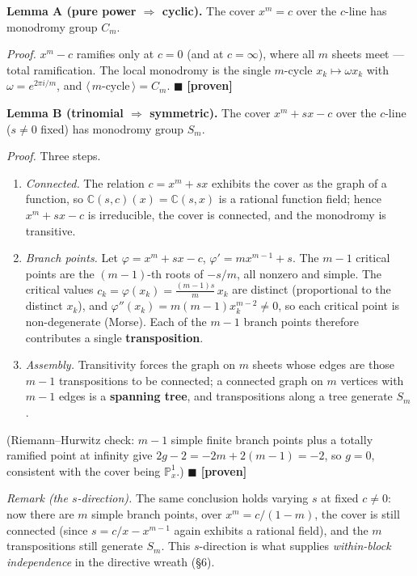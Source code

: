 \documentclass[11pt]{article}
\providecommand{\tightlist}{\setlength{\itemsep}{0pt}\setlength{\parskip}{0pt}}
\theoremstyle{plain}
\theoremstyle{definition}
\theoremstyle{remark}
\begin{document}
\textbf{Lemma A (pure power \(\Rightarrow\) cyclic).} The cover \(x^m = c\) over the \(c\)-line has monodromy group \(C_m\).

\emph{Proof.} \(x^m - c\) ramifies only at \(c = 0\) (and at \(c = \infty\)), where all \(m\) sheets meet --- total ramification. The local monodromy is the single \(m\)-cycle \(x_k \mapsto \omega x_k\) with \(\omega = e^{2\pi i/m}\), and \(\langle\,m\text{-cycle}\,\rangle = C_m\). \(\blacksquare\) \textbf{{[}proven{]}}

\textbf{Lemma B (trinomial \(\Rightarrow\) symmetric).} The cover \(x^m + sx - c\) over the \(c\)-line (\(s \neq 0\) fixed) has monodromy group \(S_m\).

\emph{Proof.} Three steps.

\begin{enumerate}
\def\labelenumi{\arabic{enumi}.}
\tightlist
\item
  \emph{Connected.} The relation \(c = x^m + sx\) exhibits the cover as the graph of a function, so \(\mathbb C(s,c)(x) = \mathbb C(s,x)\) is a rational function field; hence \(x^m+sx-c\) is irreducible, the cover is connected, and the monodromy is transitive.
\item
  \emph{Branch points.} Let \(\varphi = x^m + sx - c\), \(\varphi' = mx^{m-1}+s\). The \(m-1\) critical points are the \((m{-}1)\)-th roots of \(-s/m\), all nonzero and simple. The critical values \(c_k = \varphi(x_k) = \tfrac{(m-1)s}{m}\,x_k\) are distinct (proportional to the distinct \(x_k\)), and \(\varphi''(x_k) = m(m-1)x_k^{m-2}\neq 0\), so each critical point is non-degenerate (Morse). Each of the \(m-1\) branch points therefore contributes a single \textbf{transposition}.
\item
  \emph{Assembly.} Transitivity forces the graph on \(m\) sheets whose edges are those \(m-1\) transpositions to be connected; a connected graph on \(m\) vertices with \(m-1\) edges is a \textbf{spanning tree}, and transpositions along a tree generate \(S_m\).
\end{enumerate}

(Riemann--Hurwitz check: \(m-1\) simple finite branch points plus a totally ramified point at infinity give \(2g-2 = -2m + 2(m-1) = -2\), so \(g = 0\), consistent with the cover being \(\mathbb P^1_x\).) \(\blacksquare\) \textbf{{[}proven{]}}

\emph{Remark (the \(s\)-direction).} The same conclusion holds varying \(s\) at fixed \(c \neq 0\): now there are \(m\) simple branch points, over \(x^m = c/(1-m)\), the cover is still connected (since \(s = c/x - x^{m-1}\) again exhibits a rational field), and the \(m\) transpositions still generate \(S_m\). This \(s\)-direction is what supplies \emph{within-block independence} in the directive wreath (§6).
\end{document}
